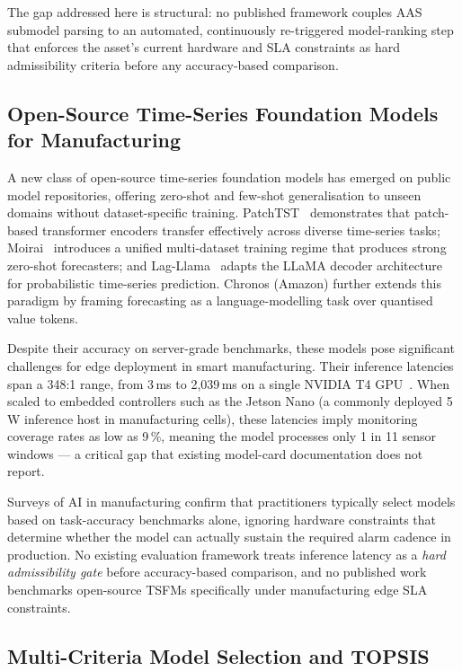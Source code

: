 \documentclass[12pt,a4paper]{article}
\begin{document}
The gap addressed here is structural: no published framework couples
AAS submodel parsing to an automated, continuously re-triggered
model-ranking step that enforces the asset's current hardware and
SLA constraints as hard admissibility criteria before any
accuracy-based comparison.

\subsection{Open-Source Time-Series Foundation Models for Manufacturing}
\label{subsec:rel-tsfm}

A new class of open-source time-series foundation models has emerged
on public model repositories, offering zero-shot and few-shot
generalisation to unseen domains without dataset-specific training.
PatchTST~\cite{nie2023patchtst} demonstrates that patch-based
transformer encoders transfer effectively across diverse time-series
tasks; Moirai~\cite{woo2024moirai} introduces a unified multi-dataset
training regime that produces strong zero-shot forecasters; and
Lag-Llama~\cite{rasul2024lagllama} adapts the LLaMA decoder
architecture for probabilistic time-series prediction.
Chronos (Amazon) further extends this paradigm by framing
forecasting as a language-modelling task over quantised value tokens.

Despite their accuracy on server-grade benchmarks, these models
pose significant challenges for edge deployment in smart
manufacturing.
Their inference latencies span a 348:1 range, from 3\,ms to
2{,}039\,ms on a single NVIDIA T4 GPU~\cite{Bifet2007ADWIN}.
When scaled to embedded controllers such as the Jetson Nano (a
commonly deployed 5\,W inference host in manufacturing cells), these
latencies imply monitoring coverage rates as low as 9\,\%,
meaning the model processes only 1 in 11 sensor windows --- a
critical gap that existing model-card documentation does not
report.

Surveys of AI in manufacturing confirm that practitioners typically
select models based on task-accuracy benchmarks alone, ignoring
hardware constraints that determine whether the model can actually
sustain the required alarm cadence in production.
No existing evaluation framework treats inference latency as a
\emph{hard admissibility gate} before accuracy-based comparison,
and no published work benchmarks open-source TSFMs specifically
under manufacturing edge SLA constraints.

\subsection{Multi-Criteria Model Selection and TOPSIS}
\label{subsec:rel-mcdm}
\end{document}
